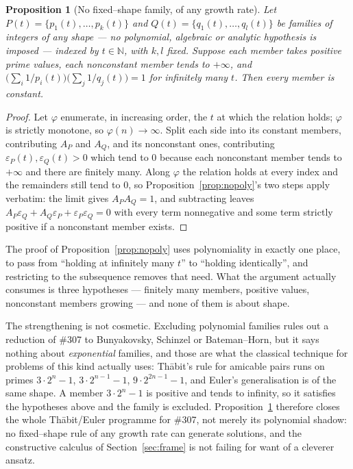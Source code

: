 \documentclass[11pt]{article}
\newtheorem{proposition}[theorem]{Proposition}
\theoremstyle{definition}
\begin{document}
\begin{proposition}[No fixed--shape family, of any growth rate]\label{prop:nofamily}
Let $P(t)=\{p_1(t),\dots,p_k(t)\}$ and $Q(t)=\{q_1(t),\dots,q_l(t)\}$ be families of integers of
\emph{any} shape --- no polynomial, algebraic or analytic hypothesis is imposed --- indexed by
$t\in\mathbb{N}$, with $k,l$ fixed. Suppose each member takes positive prime values, each nonconstant
member tends to $+\infty$, and
$\bigl(\sum_i1/p_i(t)\bigr)\bigl(\sum_j1/q_j(t)\bigr)=1$ for \emph{infinitely many} $t$. Then every
member is constant.
\end{proposition}
\begin{proof}
Let $\varphi$ enumerate, in increasing order, the $t$ at which the relation holds; $\varphi$ is
strictly monotone, so $\varphi(n)\to\infty$. Split each side into its constant members, contributing
$A_P$ and $A_Q$, and its nonconstant ones, contributing $\varepsilon_P(t),\varepsilon_Q(t)>0$ which
tend to $0$ because each nonconstant member tends to $+\infty$ and there are finitely many. Along
$\varphi$ the relation holds at every index and the remainders still tend to $0$, so
Proposition~\ref{prop:nopoly}'s two steps apply verbatim: the limit gives $A_PA_Q=1$, and subtracting
leaves $A_P\varepsilon_Q+A_Q\varepsilon_P+\varepsilon_P\varepsilon_Q=0$ with every term nonnegative
and some term strictly positive if a nonconstant member exists.
\end{proof}

The proof of Proposition~\ref{prop:nopoly} uses polynomiality in exactly one place, to pass from
``holding at infinitely many $t$'' to ``holding identically'', and restricting to the subsequence
removes that need. What the argument actually consumes is three hypotheses --- finitely many members,
positive values, nonconstant members growing --- and none of them is about shape.

The strengthening is not cosmetic. Excluding polynomial families rules out a reduction of \#307 to
Bunyakovsky, Schinzel or Bateman--Horn, but it says nothing about \emph{exponential} families, and
those are what the classical technique for problems of this kind actually uses: Th\=abit's rule for
amicable pairs runs on primes $3\cdot2^{n}-1$, $3\cdot2^{n-1}-1$, $9\cdot2^{2n-1}-1$, and Euler's
generalisation is of the same shape. A member $3\cdot2^{n}-1$ is positive and tends to infinity, so
it satisfies the hypotheses above and the family is excluded. Proposition~\ref{prop:nofamily}
therefore closes the whole Th\=abit/Euler programme for \#307, not merely its polynomial shadow: no
fixed--shape rule of any growth rate can generate solutions, and the constructive calculus of
Section~\ref{sec:frame} is not failing for want of a cleverer ansatz.
\end{document}
